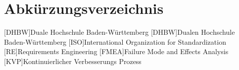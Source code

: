 \section*{Abkürzungsverzeichnis}
\begin{acronym}
  [DHBW]{Duale Hochschule Ba\-den-\-Würt\-tem\-berg}
  [DHBW]{Dualen Hochschule Ba\-den-\-Würt\-tem\-berg}
  [ISO]{International Organization for Standardization}
  [RE]{Requirements Engineering}
  [FMEA]{Failure Mode and Effects Analysis}
  [KVP]{Kontinuierlicher Verbesserungs Prozess}
\end{acronym}
\newpage
